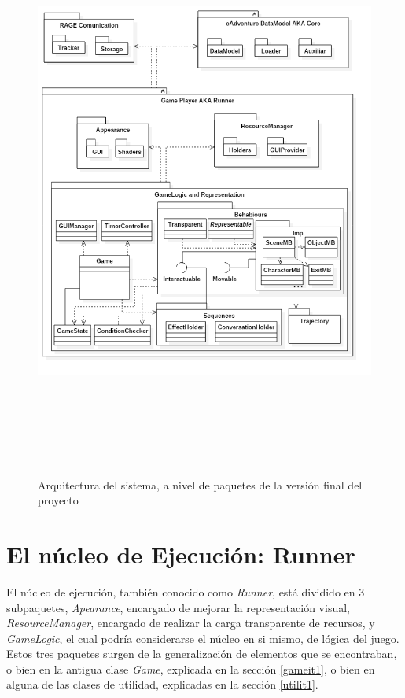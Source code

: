 \begin{figure}[h!]
	\centerline{\includegraphics[height=7.5in]{figures/it2/Arquitectura.png}}
	\caption[Arquitectura - Versión Final]{Arquitectura del sistema, a nivel de paquetes de la versión final del proyecto}
	\label{arquitecturait2}
\end{figure}

\newpage

\section{El núcleo de Ejecución: Runner}
\label{runnerit2}

El núcleo de ejecución, también conocido como \textit{Runner}, está dividido en 3 subpaquetes, \textit{Apearance}, encargado de mejorar la representación visual, \textit{ResourceManager}, encargado de realizar la carga transparente de recursos, y \textit{GameLogic}, el cual podría considerarse el núcleo en si mismo, de lógica del juego. Estos tres paquetes surgen de la generalización de elementos que se encontraban, o bien en la antigua clase \textit{Game}, explicada en la sección \ref{gameit1}, o bien en alguna de las clases de utilidad, explicadas en la sección \ref{utilit1}.


